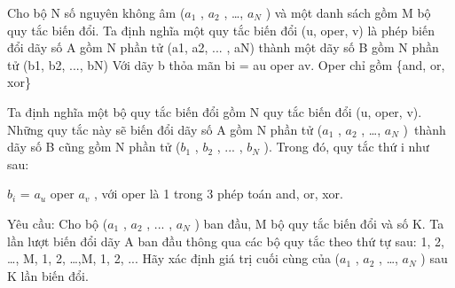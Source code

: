 Cho bộ N số nguyên không âm ($a_{1}$   , $a_{2}$   , …, $a_{N}$   ) và một danh sách gồm M bộ quy tắc biến đổi.       Ta định nghĩa một quy tắc biến đổi (u, oper, v) là phép biến đổi dãy số A gồm N phần tử (a1, a2, ... , aN) thành một dãy số B gồm N phần tử (b1, b2, ..., bN)       Với dãy b thỏa mãn       bi = au oper av. Oper chỉ gồm \{and, or, xor\}    

   Ta định nghĩa một bộ quy tắc biến đổi gồm N quy tắc biến đổi (u, oper, v). Những quy tắc này sẽ biến đổi dãy số A gồm N phần tử ($a_{1}$   , $a_{2}$   , …, $a_{N}$   ) thành dãy số B cũng gồm N phần tử ($b_{1}$   , $b_{2}$   , ... , $b_{N}$   ). Trong đó, quy tắc thứ i như sau:  

   $b_{i}$   = $a_{u}$   oper $a_{v}$   , với oper là 1 trong 3 phép toán and, or, xor.  




   Yêu cầu: Cho bộ ($a_{1}$   , $a_{2}$   , ... , $a_{N}$   ) ban đầu, M bộ quy tắc biến đổi và số K. Ta lần lượt biến đổi dãy A ban đầu thông qua các bộ quy tắc theo thứ tự sau: 1, 2, …, M, 1, 2, …,M, 1, 2, ... Hãy xác định giá trị cuối cùng của ($a_{1}$   , $a_{2}$   , …, $a_{N}$   ) sau K lần biến đổi.